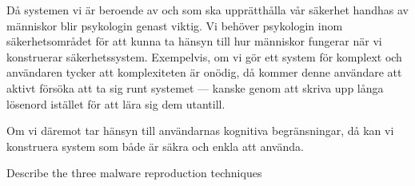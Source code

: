   \begin{solution}
    Då systemen vi är beroende av och som ska upprätthålla vår säkerhet 
    handhas av människor blir psykologin genast viktig.
    Vi behöver psykologin inom säkerhetsområdet för att kunna ta hänsyn till 
    hur människor fungerar när vi konstruerar säkerhetssystem.
    Exempelvis, om vi gör ett system för komplext och användaren tycker att 
    komplexiteten är onödig, då kommer denne användare att aktivt försöka att 
    ta sig runt systemet --- kanske genom att skriva upp långa lösenord 
    istället för att lära sig dem utantill.

    Om vi däremot tar hänsyn till användarnas kognitiva begränsningar, då kan 
    vi konstruera system som både är säkra och enkla att använda.
  \end{solution}
\question
Describe the three malware reproduction techniques


